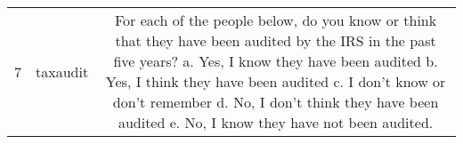 \begin{table}[!h]
{\begin{tabular}{|c|c|c|}
7& taxaudit &  \parbox[c][0.10\textheight][c]{0.68\textwidth} {  \footnotesize
For each of the people below, do you know or think that they have been audited by the IRS in the past five years? a. Yes, I know they have been audited
b. Yes, I think they have been audited
c. I don't know or don't remember
d. No, I don't think they have been audited
e. No, I know they have not been audited.}\\  \hline
\end{tabular}
}
\end{table}